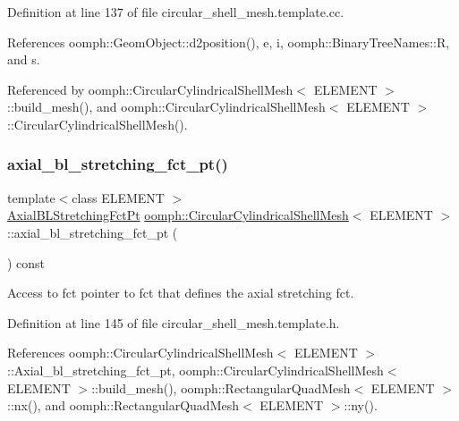 Definition at line 137 of file circular\+\_\+shell\+\_\+mesh.\+template.\+cc.



References oomph\+::\+Geom\+Object\+::d2position(), e, i, oomph\+::\+Binary\+Tree\+Names\+::R, and s.



Referenced by oomph\+::\+Circular\+Cylindrical\+Shell\+Mesh$<$ E\+L\+E\+M\+E\+N\+T $>$\+::build\+\_\+mesh(), and oomph\+::\+Circular\+Cylindrical\+Shell\+Mesh$<$ E\+L\+E\+M\+E\+N\+T $>$\+::\+Circular\+Cylindrical\+Shell\+Mesh().

\mbox{\label{classoomph_1_1CircularCylindricalShellMesh_aa9c69dc3c6692d19706178d558d07f86}} 
\subsubsection{\texorpdfstring{axial\+\_\+bl\+\_\+stretching\+\_\+fct\+\_\+pt()}{axial\_bl\_stretching\_fct\_pt()}}
{\footnotesize\ttfamily template$<$class E\+L\+E\+M\+E\+NT $>$ \\
\hyperlink{classoomph_1_1CircularCylindricalShellMesh_a770336fa72e8911f31b9fe3f70197a51}{Axial\+B\+L\+Stretching\+Fct\+Pt} \hyperlink{classoomph_1_1CircularCylindricalShellMesh}{oomph\+::\+Circular\+Cylindrical\+Shell\+Mesh}$<$ E\+L\+E\+M\+E\+NT $>$\+::axial\+\_\+bl\+\_\+stretching\+\_\+fct\+\_\+pt (\begin{DoxyParamCaption}{ }\end{DoxyParamCaption}) const\hspace{0.3cm}{\ttfamily [inline]}}



Access to fct pointer to fct that defines the axial stretching fct. 



Definition at line 145 of file circular\+\_\+shell\+\_\+mesh.\+template.\+h.



References oomph\+::\+Circular\+Cylindrical\+Shell\+Mesh$<$ E\+L\+E\+M\+E\+N\+T $>$\+::\+Axial\+\_\+bl\+\_\+stretching\+\_\+fct\+\_\+pt, oomph\+::\+Circular\+Cylindrical\+Shell\+Mesh$<$ E\+L\+E\+M\+E\+N\+T $>$\+::build\+\_\+mesh(), oomph\+::\+Rectangular\+Quad\+Mesh$<$ E\+L\+E\+M\+E\+N\+T $>$\+::nx(), and oomph\+::\+Rectangular\+Quad\+Mesh$<$ E\+L\+E\+M\+E\+N\+T $>$\+::ny().



